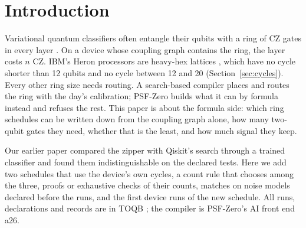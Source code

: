 \documentclass[11pt]{article}
\begin{document}
\section{Introduction}

Variational quantum classifiers often entangle their qubits with a ring of CZ gates in every layer
\cite{perez2020}. On a device whose coupling graph contains the ring, the layer costs $n$ CZ. IBM's Heron processors
are heavy-hex lattices \cite{chamberland2020}, which have no cycle shorter than 12 qubits and no cycle between 12 and 20
(Section~\ref{sec:cycles}). Every other ring size needs routing. A search-based compiler places and routes the ring
with the day's calibration; PSF-Zero \cite{psfzero} builds what it can by formula instead and refuses the rest. This
paper is about the formula side: which ring schedules can be written down from the coupling graph alone, how many
two-qubit gates they need, whether that is the least, and how much signal they keep.

Our earlier paper \cite{paper3} compared the zipper with Qiskit's search \cite{qiskit} through a trained classifier and
found them indistinguishable on the declared tests. Here we add two schedules that use the device's own cycles, a count
rule that chooses among the three, proofs or exhaustive checks of their counts, matches on noise models declared before
the runs, and the first device runs of the new schedule. All runs, declarations and records are in TOQB
\cite{toqb}; the compiler is PSF-Zero's AI front end a26.
\end{document}
